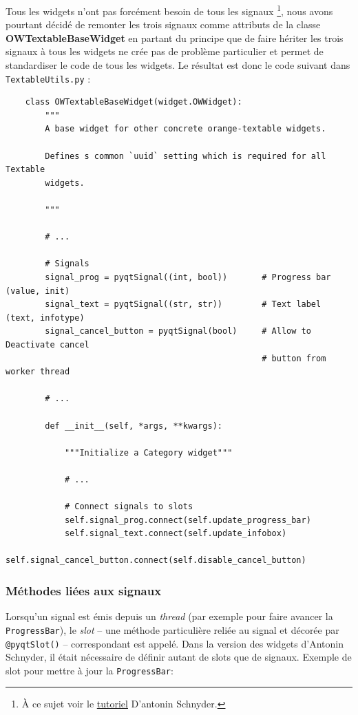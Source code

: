 \documentclass{article}
\begin{document}
Tous les widgets n'ont pas forcément besoin de tous les signaux \footnote{À ce sujet voir le \href{https://docs.google.com/document/d/1QtXm2aYMZXAyM7mfBTqxt_XrTNFqC7e3aqy7OC1A_18/edit}{tutoriel} D'antonin Schnyder.}, nous avons pourtant décidé de remonter les trois signaux comme attributs de la classe \textbf{OWTextableBaseWidget} en partant du principe que de faire hériter les trois signaux à tous les widgets ne crée pas de problème particulier et permet de standardiser le code de tous les widgets. 
\newline
Le résultat est donc le code suivant dans \texttt{TextableUtils.py} : 

\begin{verbatim}
    class OWTextableBaseWidget(widget.OWWidget):
        """
        A base widget for other concrete orange-textable widgets.
    
        Defines s common `uuid` setting which is required for all Textable
        widgets.
    
        """

        # ...

        # Signals
        signal_prog = pyqtSignal((int, bool))       # Progress bar (value, init)
        signal_text = pyqtSignal((str, str))        # Text label (text, infotype)
        signal_cancel_button = pyqtSignal(bool)     # Allow to Deactivate cancel
                                                    # button from worker thread

        # ...
        
        def __init__(self, *args, **kwargs):

            """Initialize a Category widget"""

            # ...

            # Connect signals to slots
            self.signal_prog.connect(self.update_progress_bar) 
            self.signal_text.connect(self.update_infobox)
            self.signal_cancel_button.connect(self.disable_cancel_button)
\end{verbatim}

\subsubsection{Méthodes liées aux signaux}

Lorsqu'un signal est émis depuis un \textit{thread} (par exemple pour faire avancer la \texttt{ProgressBar}),  le \textit{slot} – une méthode particulière reliée au signal et décorée par \texttt{@pyqtSlot()} – correspondant est appelé. Dans la version des widgets d'Antonin Schnyder, il était nécessaire de définir autant de slots que de signaux.
\newline
Exemple de slot pour mettre à jour la \texttt{ProgressBar}:
\end{document}
